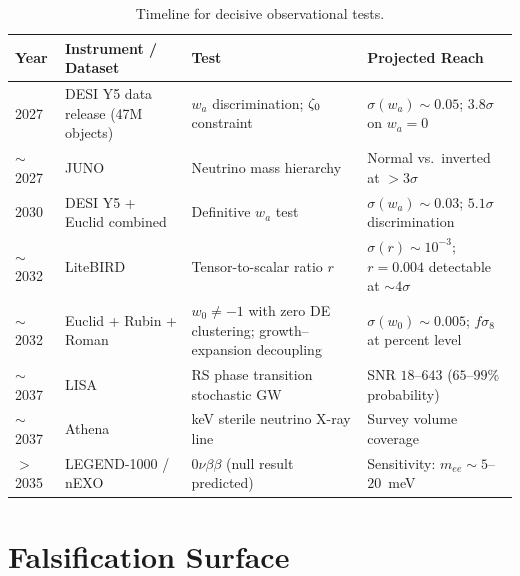 \begin{table}[h!]
\caption{Timeline for decisive observational tests.}
\label{tab:pred-timeline}
\small
\renewcommand{\arraystretch}{1.25}
\begin{tabular}{@{}p{1.5cm}p{4.5cm}p{4.5cm}p{4.5cm}@{}}
\toprule
\textbf{Year} & \textbf{Instrument / Dataset} & \textbf{Test} & \textbf{Projected Reach} \\
\midrule

2027 &
DESI Y5 data release (47M objects) &
$w_a$ discrimination; $\zeta_0$ constraint &
$\sigma(w_a) \sim 0.05$; $3.8\sigma$ on $w_a = 0$ \\

$\sim$2027 &
JUNO &
Neutrino mass hierarchy &
Normal vs.\ inverted at $>3\sigma$ \\

2030 &
DESI Y5 + Euclid combined &
Definitive $w_a$ test &
$\sigma(w_a) \sim 0.03$; $5.1\sigma$ discrimination \\

$\sim$2032 &
LiteBIRD &
Tensor-to-scalar ratio $r$ &
$\sigma(r) \sim 10^{-3}$; $r = 0.004$ detectable at $\sim 4\sigma$ \\

$\sim$2032 &
Euclid + Rubin + Roman &
$w_0 \neq -1$ with zero DE clustering; growth--expansion decoupling &
$\sigma(w_0) \sim 0.005$; $f\sigma_8$ at percent level \\

$\sim$2037 &
LISA &
RS phase transition stochastic GW &
SNR $18$--$643$ ($65$--$99\%$ probability) \\

$\sim$2037 &
Athena &
keV sterile neutrino X-ray line &
Survey volume coverage \\

$>$2035 &
LEGEND-1000 / nEXO &
$0\nu\beta\beta$ (null result predicted) &
Sensitivity: $m_{ee} \sim 5$--$20$~meV \\

\bottomrule
\end{tabular}
\end{table}

\section{Falsification Surface}
\label{app:pred-falsification}

